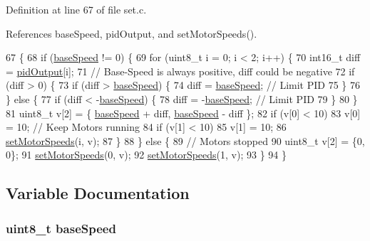 Definition at line 67 of file set.\-c.



References base\-Speed, pid\-Output, and set\-Motor\-Speeds().


\begin{DoxyCode}
67                    \{
68     \textcolor{keywordflow}{if} (\hyperlink{group__set_gab2b0c78a81e045d7a8f28be307b8c61b}{baseSpeed} != 0) \{
69         \textcolor{keywordflow}{for} (uint8\_t i = 0; i < 2; i++) \{
70             int16\_t diff = \hyperlink{group__pid_ga5b70790e470e0c5812d24a8a098c01e0}{pidOutput}[i];
71             \textcolor{comment}{// Base-Speed is always positive, diff could be negative}
72             \textcolor{keywordflow}{if} (diff > 0) \{
73                 \textcolor{keywordflow}{if} (diff > \hyperlink{group__set_gab2b0c78a81e045d7a8f28be307b8c61b}{baseSpeed}) \{
74                     diff = \hyperlink{group__set_gab2b0c78a81e045d7a8f28be307b8c61b}{baseSpeed}; \textcolor{comment}{// Limit PID}
75                 \}
76             \} \textcolor{keywordflow}{else} \{
77                 \textcolor{keywordflow}{if} (diff < -\hyperlink{group__set_gab2b0c78a81e045d7a8f28be307b8c61b}{baseSpeed}) \{
78                     diff = -\hyperlink{group__set_gab2b0c78a81e045d7a8f28be307b8c61b}{baseSpeed}; \textcolor{comment}{// Limit PID}
79                 \}
80             \}
81             uint8\_t v[2] = \{ \hyperlink{group__set_gab2b0c78a81e045d7a8f28be307b8c61b}{baseSpeed} + diff, \hyperlink{group__set_gab2b0c78a81e045d7a8f28be307b8c61b}{baseSpeed} - diff \};
82             \textcolor{keywordflow}{if} (v[0] < 10)
83                 v[0] = 10; \textcolor{comment}{// Keep Motors running}
84             \textcolor{keywordflow}{if} (v[1] < 10)
85                 v[1] = 10;
86             \hyperlink{group__set_ga4173baf06c19647e0c60ef2e910bbc87}{setMotorSpeeds}(i, v);
87         \}
88     \} \textcolor{keywordflow}{else} \{
89         \textcolor{comment}{// Motors stopped}
90         uint8\_t v[2] = \{0, 0\};
91         \hyperlink{group__set_ga4173baf06c19647e0c60ef2e910bbc87}{setMotorSpeeds}(0, v);
92         \hyperlink{group__set_ga4173baf06c19647e0c60ef2e910bbc87}{setMotorSpeeds}(1, v);
93     \}
94 \}
\end{DoxyCode}


\subsection{Variable Documentation}
\hypertarget{group__set_gab2b0c78a81e045d7a8f28be307b8c61b}{
\subsubsection[{base\-Speed}]{\setlength{\rightskip}{0pt plus 5cm}uint8\-\_\-t base\-Speed}}\label{group__set_gab2b0c78a81e045d7a8f28be307b8c61b}


